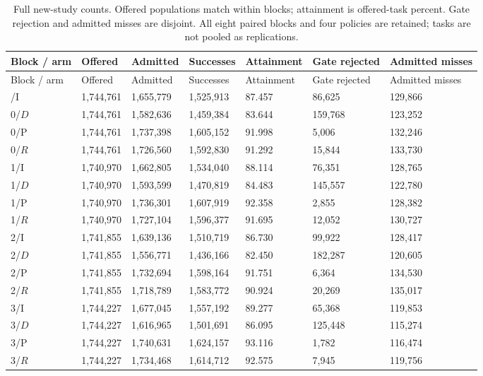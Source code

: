\documentclass[12pt,a4paper]{article}
\begin{document}
\begingroup
\singlespacing\footnotesize\setlength{\tabcolsep}{3pt}
\begin{xltabular}{\textwidth}{@{}YYYYYYY@{}}
\caption[All confirmation cells]{Full new-study counts. Offered populations match within blocks; attainment is offered-task percent. Gate rejection and admitted misses are disjoint. All eight paired blocks and four policies are retained; tasks are not pooled as replications.}\label{tab:E1} \\
\toprule
Block / arm & Offered & Admitted & Successes & Attainment & Gate rejected & Admitted misses \\
\midrule\endfirsthead
\toprule
Block / arm & Offered & Admitted & Successes & Attainment & Gate rejected & Admitted misses \\
\midrule\endhead
\bottomrule{}/I & 1,744,761 & 1,655,779 & 1,525,913 & 87.457 & 86,625 & 129,866 \\
0/$D$ & 1,744,761 & 1,582,636 & 1,459,384 & 83.644 & 159,768 & 123,252 \\
0/P & 1,744,761 & 1,737,398 & 1,605,152 & 91.998 & 5,006 & 132,246 \\
0/$R$ & 1,744,761 & 1,726,560 & 1,592,830 & 91.292 & 15,844 & 133,730 \\
1/I & 1,740,970 & 1,662,805 & 1,534,040 & 88.114 & 76,351 & 128,765 \\
1/$D$ & 1,740,970 & 1,593,599 & 1,470,819 & 84.483 & 145,557 & 122,780 \\
1/P & 1,740,970 & 1,736,301 & 1,607,919 & 92.358 & 2,855 & 128,382 \\
1/$R$ & 1,740,970 & 1,727,104 & 1,596,377 & 91.695 & 12,052 & 130,727 \\
2/I & 1,741,855 & 1,639,136 & 1,510,719 & 86.730 & 99,922 & 128,417 \\
2/$D$ & 1,741,855 & 1,556,771 & 1,436,166 & 82.450 & 182,287 & 120,605 \\
2/P & 1,741,855 & 1,732,694 & 1,598,164 & 91.751 & 6,364 & 134,530 \\
2/$R$ & 1,741,855 & 1,718,789 & 1,583,772 & 90.924 & 20,269 & 135,017 \\
3/I & 1,744,227 & 1,677,045 & 1,557,192 & 89.277 & 65,368 & 119,853 \\
3/$D$ & 1,744,227 & 1,616,965 & 1,501,691 & 86.095 & 125,448 & 115,274 \\
3/P & 1,744,227 & 1,740,631 & 1,624,157 & 93.116 & 1,782 & 116,474 \\
3/$R$ & 1,744,227 & 1,734,468 & 1,614,712 & 92.575 & 7,945 & 119,756 \\

\end{xltabular}
\end{document}
